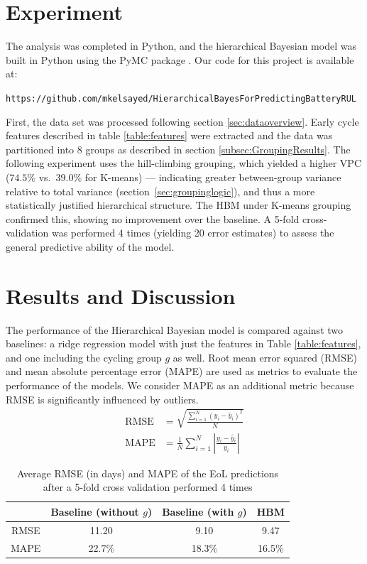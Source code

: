 \section{Experiment}

The analysis was completed in Python, and the hierarchical Bayesian model was built in Python using the PyMC package \cite{pymc2023}. Our code for this project is available at: 

\texttt{https://github.com/mkelsayed/HierarchicalBayesForPredictingBatteryRUL}

First, the data set was processed following section \ref{sec:dataoverview}. Early cycle features described in table \ref{table:features} were extracted and the data was partitioned into 8 groups as described in section \ref{subsec:GroupingResults}. 
The following experiment uses the hill-climbing grouping, which yielded a higher VPC ($74.5\%$ vs.\ $39.0\%$ for K-means) — indicating greater between-group variance 
relative to total variance (section~\ref{sec:groupinglogic}), and thus a more statistically justified hierarchical structure. The HBM under K-means grouping confirmed this, showing no improvement over the baseline.
A 5-fold cross-validation was performed 4 times (yielding 20 error estimates) to assess the general predictive ability of the model.

\section{Results and Discussion}

The performance of the Hierarchical Bayesian model is compared against two baselines: a ridge regression model with just the features in Table \ref{table:features}, and one including the cycling group $g$ as well. Root mean error squared (RMSE) and mean absolute percentage error (MAPE) are used as metrics to evaluate the performance of the models. We consider MAPE as an additional metric because RMSE is significantly influenced by outliers.
\begin{align*}
    \text{RMSE} &= \sqrt{\frac{\sum^N_{i=1} (y_i - \hat{y}_i)^2}{N}} \\
    \text{MAPE} &= \frac{1}{N}\sum^N_{i=1} \left| \frac{y_i - \hat{y}_i}{y_i} \right|
\end{align*}

\begin{table}[!htb]
\centering
\begin{tabular}{cccc}
\hline
             &   Baseline (without $g$) & Baseline (with $g$) &     HBM     \\
\hline
     RMSE    &    11.20                 &    9.10             &     9.47    \\
     MAPE    &    22.7\%                &    18.3\%           &     16.5\%  \\
\hline
\end{tabular}
\caption{Average RMSE (in days) and MAPE of the EoL predictions after a 5-fold cross validation performed 4 times}
\label{table:RMSEandMAPE}
\end{table}

